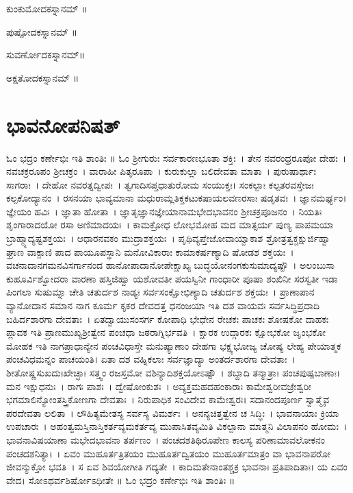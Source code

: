 ಕುಂಕುಮೋದಕಸ್ನಾನಮ್ ॥

ಪುಷ್ಪೋದಕಸ್ನಾನಮ್ ॥

ಸುವರ್ಣೋದಕಸ್ನಾನಮ್॥

 ಅಕ್ಷತೋದಕಸ್ನಾನಮ್ ॥

\section{ಭಾವನೋಪನಿಷತ್}
ಓಂ ಭದ್ರಂ ಕರ್ಣೇಭಿಃ ಇತಿ ಶಾಂತಿಃ ॥
ಓಂ ಶ್ರೀಗುರುಃ ಸರ್ವಕಾರಣಭೂತಾ ಶಕ್ತಿಃ~। ತೇನ ನವರಂಧ್ರರೂಪೋ ದೇಹಃ~। ನವಚಕ್ರರೂಪಂ ಶ್ರೀಚಕ್ರಂ~। ವಾರಾಹೀ ಪಿತೃರೂಪಾ~। ಕುರುಕುಲ್ಲಾ ಬಲಿದೇವತಾ ಮಾತಾ~। ಪುರುಷಾರ್ಥಾಃ ಸಾಗರಾಃ~। ದೇಹೋ ನವರತ್ನದ್ವೀಪಃ~। ತ್ವಗಾದಿಸಪ್ತಧಾತುರೋಮ ಸಂಯುಕ್ತಃ। ಸಂಕಲ್ಪಾಃ ಕಲ್ಪತರವಸ್ತೇಜಃ ಕಲ್ಪಕೋ\-ದ್ಯಾನಂ~। ರಸನಯಾ ಭಾವ್ಯಮಾನಾ ಮಧುರಾಮ್ಲತಿಕ್ತಕಟುಕಷಾಯಲವಣರಸಾಃ ಷಡೃತವಃ~। ಜ್ಞಾನಮರ್ಘ್ಯಂ। ಜ್ಞೇಯಂ ಹವಿಃ~। ಜ್ಞಾತಾ ಹೋತಾ~। ಜ್ಞಾತೃಜ್ಞಾನಜ್ಞೇಯಾನಾಮಭೇದಭಾವನಂ ಶ್ರೀಚಕ್ರಪೂಜನಂ~। ನಿಯತಿಃ ಶೃಂಗಾರಾದಯೋ ರಸಾ ಅಣಿಮಾದಯಃ~। ಕಾಮಕ್ರೋಧ ಲೋಭಮೋಹ ಮದ ಮಾತ್ಸರ್ಯ ಪುಣ್ಯ ಪಾಪಮಯಾ ಬ್ರಾಹ್ಮ್ಯಾದ್ಯಷ್ಟಶಕ್ತಯಃ~। ಆಧಾರನವಕಂ ಮುದ್ರಾಶಕ್ತಯಃ~। ಪೃಥಿವ್ಯಪ್ತೇಜೋವಾಯ್ವಾಕಾಶ ಶ್ರೋತ್ರತ್ವಕ್ಚಕ್ಷುರ್ಜಿಹ್ವಾ ಘ್ರಾಣ ವಾಕ್ಪಾಣಿ ಪಾದ ಪಾಯೂಪಸ್ಥಾನಿ ಮನೋವಿಕಾರಾಃ ಕಾಮಾಕರ್ಷಣ್ಯಾದಿ ಷೋಡಶ ಶಕ್ತಯಃ~। ವಚನಾದಾನಗಮನವಿಸರ್ಗಾನಂದ ಹಾನೋಪಾದಾನೋಪೇಕ್ಷಾಖ್ಯ ಬುದ್ಧಯೋನಂಗಕುಸುಮಾದ್ಯಷ್ಟೌ~। ಅಲಂಬುಸಾ ಕುಹೂರ್ವಿಶ್ವೋದರಾ ವಾರಣಾ ಹಸ್ತಿಜಿಹ್ವಾ ಯಶೋವತೀ ಪಯಸ್ವಿನೀ ಗಾಂಧಾರೀ ಪೂಷಾ ಶಂಖಿನೀ ಸರಸ್ವತೀ ಇಡಾ ಪಿಂಗಲಾ ಸುಷುಮ್ನಾ ಚೇತಿ ಚತುರ್ದಶ ನಾಡ್ಯಃ ಸರ್ವಸಂಕ್ಷೋಭಿಣ್ಯಾದಿ ಚತುರ್ದಶ ಶಕ್ತಯಃ~। ಪ್ರಾಣಾಪಾನ ವ್ಯಾನೋದಾನ ಸಮಾನ ನಾಗ ಕೂರ್ಮ ಕೃಕರ ದೇವದತ್ತ ಧನಂಜಯಾ ಇತಿ ದಶ ವಾಯವಃ ಸರ್ವಸಿದ್ಧಿಪ್ರದಾದಿ ಬಹಿರ್ದಶಾರಗಾ ದೇವತಾಃ~। ಏತದ್ವಾಯುಸಂಸರ್ಗ ಕೋಪಾಧಿ ಭೇಧೇನ ರೇಚಕಃ ಪಾಚಕಃ ಶೋಷಕೋ ದಾಹಕಃ ಪ್ಲಾವಕ ಇತಿ ಪ್ರಾಣಮುಖ್ಯಶ್ರೀತ್ವೇನ ಪಂಚಧಾ ಜಠರಾಗ್ನಿರ್ಭವತಿ~। ಕ್ಷಾರಕ ಉದ್ಗಾರಕಃ ಕ್ಷೋಭಕೋ ಜೃಂಭಕೋ ಮೋಹಕ ಇತಿ ನಾಗಪ್ರಾಧಾನ್ಯೇನ ಪಂಚವಿಧಾಸ್ತೇ ಮನುಷ್ಯಾಣಾಂ ದೇಹಗಾ ಭಕ್ಷ್ಯಭೋಜ್ಯ ಚೋಷ್ಯ ಲೇಹ್ಯ ಪೇಯಾತ್ಮಕ ಪಂಚವಿಧಮನ್ನಂ ಪಾಚಯಂತಿ। ಏತಾ ದಶ ವಹ್ನಿಕಲಾಃ ಸರ್ವಜ್ಞಾದ್ಯಾ ಅಂತರ್ದಶಾರಗಾ ದೇವತಾಃ~। ಶೀತೋಷ್ಣಸುಖದುಃಖೇಚ್ಛಾಃ ಸತ್ತ್ವಂ ರಜಸ್ತಮೋ ವಶಿನ್ಯಾದಿಶಕ್ತಯೋಽಷ್ಟೌ~। ಶಬ್ದಾದಿ ತನ್ಮಾತ್ರಾಃ ಪಂಚಪುಷ್ಪಬಾಣಾಃ। ಮನ ಇಕ್ಷುಧನುಃ~। ರಾಗಃ ಪಾಶಃ~। ದ್ವೇಷೋಂಕುಶಃ~। ಅವ್ಯಕ್ತಮಹದಹಂಕಾರಾಃ ಕಾಮೇಶ್ವರೀವಜ್ರೇಶ್ವರೀ ಭಗಮಾಲಿನ್ಯೋಂತಸ್ತ್ರಿಕೋಣಗಾ ದೇವತಾಃ~। ನಿರುಪಾಧಿಕ ಸಂವಿದೇವ ಕಾಮೇಶ್ವರಃ। ಸದಾನಂದಪೂರ್ಣ ಸ್ವಾತ್ಮೈವ ಪರದೇವತಾ ಲಲಿತಾ~। ಲೌಹಿತ್ಯಮೇತಸ್ಯ ಸರ್ವಸ್ಯ ವಿಮರ್ಶಃ~। ಅನನ್ಯಚಿತ್ತತ್ವೇನ ಚ ಸಿದ್ಧಿಃ~। ಭಾವನಾಯಾಃ ಕ್ರಿಯಾ ಉಪಚಾರಃ~। ಅಹಂತ್ವಮಸ್ತಿನಾಸ್ತಿಕರ್ತವ್ಯಮಕರ್ತವ್ಯ ಮುಪಾಸಿತವ್ಯಮಿತಿ ವಿಕಲ್ಪಾನಾ ಮಾತ್ಮನಿ ವಿಲಾಪನಂ ಹೋಮಃ~। ಭಾವನಾವಿಷಯಾಣಾ ಮಭೇದಭಾವನಾ ತರ್ಪಣಂ~। ಪಂಚದಶತಿಥಿರೂಪೇಣ ಕಾಲಸ್ಯ ಪರಿಣಾಮಾವಲೋಕನಂ ಪಂಚದಶನಿತ್ಯಾಃ~। ಏವಂ ಮುಹೂರ್ತತ್ರಿತಯಂ ಮುಹೂರ್ತದ್ವಿತಯಂ ಮುಹೂರ್ತಮಾತ್ರಂ ವಾ ಭಾವನಾಪರೋ ಜೀವನ್ಮುಕ್ತೋ ಭವತಿ~। ಸ ಏವ ಶಿವಯೋಗೀತಿ ಗದ್ಯತೇ~। ಕಾದಿಮತೇನಾಂತಶ್ಚಕ್ರ ಭಾವನಾಃ ಪ್ರತಿಪಾದಿತಾಃ। ಯ ಏವಂ ವೇದ। ಸೋಽಥರ್ವಶಿರ್ಷೋಽಧೀತೇ ॥ ಓಂ ಭದ್ರಂ ಕರ್ಣೇಭಿಃ ಇತಿ ಶಾಂತಿಃ ॥



